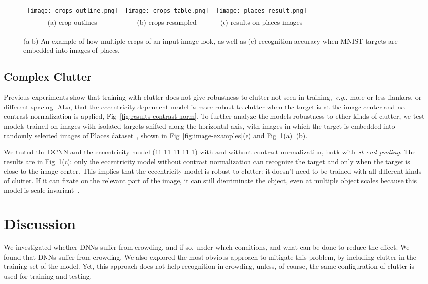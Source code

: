 \documentclass{article}
\makeatletter
\DeclareRobustCommand\onedot{\futurelet\@let@token\@onedot}
\def\@onedot{\ifx\@let@token.\else.\null\fi\xspace}
\def\eg{\emph{e.g}\onedot} \def\Eg{\emph{E.g}\onedot}
\makeatother
\begin{document}
\begin{figure}[t!]
\centering
\begin{tabu}{ccc}
\texttt{[image: crops\_outline.png]}
& \texttt{[image: crops\_table.png]} & 
\texttt{[image: places\_result.png]}\\{\small(a) crop outlines} & {\small(b) crops resampled} & {\small(c) results on places images} \\
\end{tabu}
\caption{\small{(a-b) An example of how multiple crops of an input image look, as well as (c) recognition accuracy when MNIST targets are embedded into images of places.\vspace*{-0.36cm}}}
\label{fig:crops}
\end{figure}\vspace*{-0.20cm}\subsection{Complex Clutter}\vspace*{-0.30cm}
Previous experiments show that training with clutter does not give robustness to clutter not seen in training,~\eg more or less flankers, or different spacing. Also, that the eccentricity-dependent model is more robust to clutter when the target is at the image center and no contrast normalization is applied, Fig~\ref{fig:results-contrast-norm}. 
To further analyze the models robustness to other kinds of clutter, we test models trained on images with isolated targets shifted along the horizontal axis, with images in which the target is embedded into randomly selected images of Places dataset~\cite{zhou2014learning}, shown in Fig~\ref{fig:image-examples}(e) and Fig~\ref{fig:crops}(a), (b).  


We tested the DCNN and the eccentricity model (11-11-11-11-1) with and without contrast normalization, both with \emph{at end pooling}. The results are in Fig~\ref{fig:crops}(c):  only the eccentricity model without contrast normalization can recognize the target and only when the target is close to the image center. 
This implies that the eccentricity model is robust to clutter: it doesn't need to be trained with all different kinds of clutter.  If it can fixate on the relevant part of the image, it can still discriminate the object, even at multiple object scales because this model is scale invariant~\cite{poggio2014computational}.


\vspace*{-0.25cm}\section{Discussion}\vspace*{-0.30cm}
We investigated whether DNNs suffer from crowding, and if so, under which conditions, and what can be done to reduce the effect.
We found that DNNs suffer from crowding. We also explored the most obvious approach to mitigate this problem, by including clutter in the training set of the model.  Yet, this approach does not help recognition in crowding, unless, of course,  the same configuration of clutter is used for training and testing.  
\end{document}
